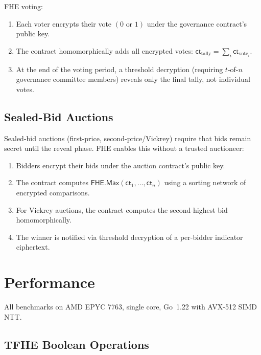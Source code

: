 \documentclass[11pt,a4paper]{article}
\begin{document}
FHE voting:
\begin{enumerate}[leftmargin=2em]
  \item Each voter encrypts their vote $(0 \text{ or } 1)$ under the governance
        contract's public key.
  \item The contract homomorphically adds all encrypted votes:
        $\textsf{ct}_{\text{tally}} = \sum_i \textsf{ct}_{\text{vote}_i}$.
  \item At the end of the voting period, a threshold decryption (requiring $t$-of-$n$
        governance committee members) reveals only the final tally, not individual
        votes.
\end{enumerate}

\subsection{Sealed-Bid Auctions}

Sealed-bid auctions (first-price, second-price/Vickrey) require that bids remain
secret until the reveal phase. FHE enables this without a trusted auctioneer:

\begin{enumerate}[leftmargin=2em]
  \item Bidders encrypt their bids under the auction contract's public key.
  \item The contract computes $\textsf{FHE.Max}(\textsf{ct}_1, \ldots, \textsf{ct}_n)$
        using a sorting network of encrypted comparisons.
  \item For Vickrey auctions, the contract computes the second-highest bid
        homomorphically.
  \item The winner is notified via threshold decryption of a per-bidder indicator
        ciphertext.
\end{enumerate}

\section{Performance}
\label{sec:performance}

All benchmarks on AMD EPYC 7763, single core, Go~1.22 with AVX-512 SIMD NTT.

\subsection{TFHE Boolean Operations}
\end{document}

